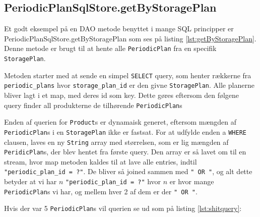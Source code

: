 \subsection{PeriodicPlanSqlStore.getByStoragePlan}
Et godt eksempel på en DAO metode benyttet i mange SQL principper er PeriodicPlanSqlStore.getByStoragePlan som ses på listing \ref{lst:getByStoragePlan}. Denne metode er brugt til at hente alle \texttt{PeriodicPlan} fra en specifik \texttt{StoragePlan}.

Metoden starter med at sende en simpel \texttt{SELECT} query, som henter rækkerne fra 
\texttt{periodic\_plans} hvor \texttt{storage\_plan\_id} er den givne \texttt{StoragePlan}. Alle planerne bliver lagt i et map, med deres id som key. Dette gøres eftersom den følgene query finder all produkterne de tilhørende \texttt{PeriodicPlan}s

Enden af querien for \texttt{Product}s er dynamaisk generet, eftersom mængden af \texttt{PeriodicPlan}s i en \texttt{StoragePlan} ikke er fastsat. For at udfylde enden a \texttt{WHERE} clausen, laves en ny \texttt{String} array med størrelsen, som er lig mængden af \texttt{PeridicPlan}s, der blev hentet fra første query. Den array er så  lavet om til en stream, hvor map metoden kaldes til at lave alle entries, indtil \texttt{"periodic\_plan\_id = ?"}. De bliver så joined sammen med \texttt{" OR "}, og alt dette betyder at vi har $n$ \texttt{"periodic\_plan\_id = ?"} hvor $n$ er hvor mange \texttt{PeriodicPlan}s vi har, og mellem hver 2 af dem er der \texttt{" OR "}.

Hvis der var 5 \texttt{PeriodicPlan}s vil querien se ud som på listing \ref{lst:shitquery}:


